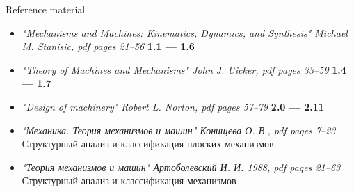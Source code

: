 \documentclass[aspectratio=169]{beamer}
\newcommand{\fbckg}[1]{\usebackgroundtemplate{\texttt{[image: \#1]}}}%
\begin{document}
\begin{frame}[t]{Reference material}
\begin{itemize}
    \item \textit{"Mechanisms and Machines: Kinematics, Dynamics, and Synthesis" Michael M. Stanisic, pdf pages 21--56 } \textbf{1.1 --- 1.6}
    \item \textit{"Theory of Machines and Mechanisms" John J. Uicker, pdf pages 33--59 } \textbf{1.4 --- 1.7}
    \item \textit{"Design of machinery" Robert L. Norton, pdf pages 57--79 } \textbf{2.0 --- 2.11}
    \item \textit{"Механика. Теория механизмов и машин" Конищева О. В., pdf pages 7--23 } \\ Структурный анализ и классификация плоских механизмов
    \item \textit{"Теория механизмов и машин" Артоболевский И. И. 1988, pdf pages 21--63 } \\ Структурный анализ и классификация механизмов
\end{itemize}
\end{frame}

\fbckg{fibeamer/figs/last_page.png}
\frame[plain]{}
\end{document}
